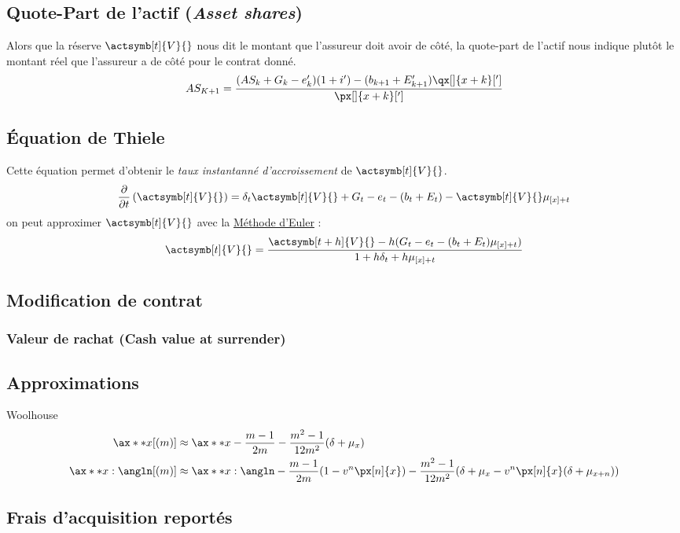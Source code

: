 \documentclass[10pt, french]{article}
\begin{document}
\begin{multicols*}{2}
\subsection*{Quote-Part de l'actif (\emph{Asset shares})}
Alors que la réserve $\actsymb[t]{V}{}$ nous dit le montant que l'assureur doit avoir de côté, la quote-part de l'actif nous indique plutôt le montant réel que l'assureur a de côté pour le contrat donné.
\[AS_{K+1} = \frac{(AS_{k} + G_k - e'_k)(1 + i') - (b_{k+1} + E'_{k+1}) \qx[]{x+k}[']     }{\px[]{x+k}[']}\]


\subsection*{Équation de Thiele}
Cette équation permet d'obtenir le \emph{taux instantanné d'accroissement} de $\actsymb[t]{V}{}$.
\[\derivee{t} \left( \actsymb[t]{V}{} \right) =\delta_t \actsymb[t]{V}{} + G_t - e_t - (b_t + E_t) - \actsymb[t]{V}{} \mu_{[x] + t}  \]
on peut approximer $\actsymb[t]{V}{}$ avec la \underline{Méthode d'Euler} : 
\[\actsymb[t]{V}{} = \frac{\actsymb[t+h]{V}{} - h(G_t - e_t - (b_t + E_t)\mu_{[x] + t})}{1 + h \delta_t + h \mu_{[x] + t}}   \]

\subsection*{Modification de contrat}
\subsubsection*{Valeur de rachat (\textbf{Cash value at surrender})}

\subsection*{Approximations}

Woolhouse
\begin{align*}
	\ax**{x}[(m)]	
	&\approx	\ax**{x}	-	\frac{m - 1}{2m}	-	\frac{m^{2} - 1}{12m^{2}}(\delta + \mu_{x})\\
	\ax**{x:\angln}[(m)]	
	&\approx	\ax**{x:\angln}	-	\frac{m - 1}{2m}(1 - v^{n}\px[n]{x})	-	\frac{m^{2} - 1}{12m^{2}}(\delta + \mu_{x} - v^{n} \px[n]{x}(\delta + \mu_{x + n}))
\end{align*}

\subsection*{Frais d'acquisition reportés}


\end{multicols*}
\end{document}
